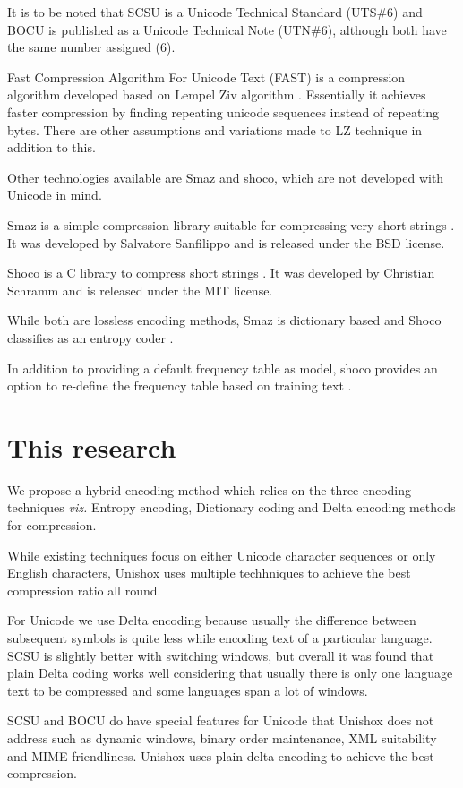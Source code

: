 \documentclass[]{article}
\begin{document}
It is to be noted that SCSU is a Unicode Technical Standard (UTS\#6) and BOCU is published as a Unicode Technical Note (UTN\#6), although both have the same number assigned (6).

Fast Compression Algorithm For Unicode Text (FAST) is a compression algorithm developed based on Lempel Ziv algorithm \cite{4}.  Essentially it achieves faster compression by finding repeating unicode sequences instead of repeating bytes.  There are other assumptions and variations made to LZ technique in addition to this. \cite{12}

Other technologies available are Smaz and shoco, which are not developed with Unicode in mind.

Smaz is a simple compression library suitable for compressing very short strings \cite{14}. It was developed by Salvatore Sanfilippo and is released under the BSD license.

Shoco is a C library to compress short strings \cite{15}. It was developed by Christian Schramm and is released under the MIT license.

While both are lossless encoding methods, Smaz is dictionary based and Shoco classifies as an entropy coder \cite{15}.

In addition to providing a default frequency table as model, shoco provides an option to re-define the frequency table based on training text \cite{15}.

\section{This research}

We propose a hybrid encoding method which relies on the three encoding techniques \emph{viz.} Entropy encoding, Dictionary coding and Delta encoding methods for compression.

While existing techniques focus on either Unicode character sequences or only English characters, Unishox uses multiple techhniques to achieve the best compression ratio all round.

For Unicode we use Delta encoding because usually the difference between subsequent symbols is quite less while encoding text of a particular language.  SCSU is slightly better with switching windows, but overall it was found that plain Delta coding works well considering that usually there is only one language text to be compressed and some languages span a lot of windows.

SCSU and BOCU do have special features for Unicode that Unishox does not address such as dynamic windows, binary order maintenance, XML suitability and MIME friendliness. Unishox uses plain delta encoding to achieve the best compression.
\end{document}
